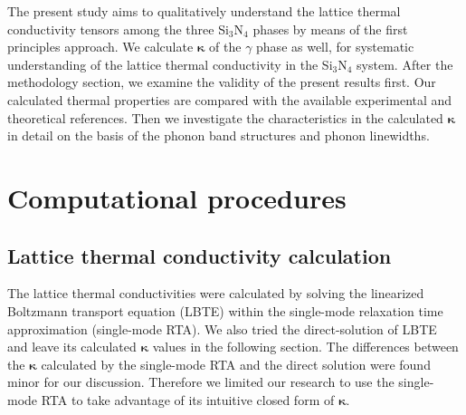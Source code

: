 \documentclass[twocolumn,amsmath,amssymb,a4paper,prb,superscriptaddress,floatfix]{revtex4-1}
\begin{document}
The present study aims to qualitatively understand the lattice thermal
conductivity tensors among the three Si$_3$N$_4$ phases by means of the first
principles approach.  We calculate $\boldsymbol{\kappa}$ of the $\gamma$ phase
as well, for systematic understanding of the lattice thermal conductivity in the
Si$_3$N$_4$ system.  After the methodology section, we examine the validity of
the present results first.  Our calculated thermal properties are compared with
the available experimental and theoretical references.  Then we investigate the
characteristics in the calculated $\boldsymbol{\kappa}$ in detail on the basis
of the phonon band structures and phonon linewidths.

\section{Computational procedures}

\subsection{Lattice thermal conductivity calculation}

The lattice thermal conductivities were calculated by solving the linearized
Boltzmann transport equation (LBTE) within the single-mode relaxation time
approximation (single-mode RTA).  We also tried the direct-solution of
LBTE~\cite{chaput-direct} and leave its calculated $\boldsymbol{\kappa}$ values
in the following section. The differences between the
$\boldsymbol{\kappa}$ calculated by the single-mode RTA and the direct solution
were found minor for our discussion. Therefore we limited our research to use
the single-mode RTA to take advantage of its intuitive closed form of
$\boldsymbol{\kappa}$.
\end{document}
